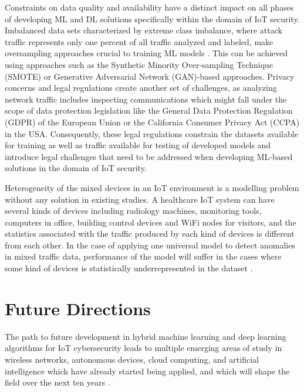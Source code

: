 \documentclass[12pt]{article}
\begin{document}
Constraints on data quality and availability have a distinct impact on all phases of developing ML and DL solutions specifically within the domain of IoT security. Imbalanced data sets characterized by extreme class imbalance, where attack traffic represents only one percent of all traffic analyzed and labeled, make oversampling approaches crucial to training ML models \cite{pajouh2019two}. This can be achieved using approaches such as the Synthetic Minority Over-sampling Technique (SMOTE) or Generative Adversarial Network (GAN)-based approaches. Privacy concerns and legal regulations create another set of challenges, as analyzing network traffic includes inspecting communications which might fall under the scope of data protection legislation like the General Data Protection Regulation (GDPR) of the European Union or the California Consumer Privacy Act (CCPA) in the USA. Consequently, these legal regulations constrain the datasets available for training as well as traffic available for testing of developed models and introduce legal challenges that need to be addressed when developing ML-based solutions in the domain of IoT security.

Heterogeneity of the mixed devices in an IoT environment is a modelling problem without any solution in existing studies. A healthcare IoT system can have several kinds of devices including radiology machines, monitoring tools, computers in office, building control devices and WiFi nodes for visitors, and the statistics associated with the traffic produced by each kind of devices is different from each other. In the case of applying one universal model to detect anomalies in mixed traffic data, performance of the model will suffer in the cases where some kind of devices is statistically underrepresented in the dataset \cite{alaba2017internet}.


\section{Future Directions}

The path to future development in hybrid machine learning and deep learning algorithms for IoT cybersecurity leads to multiple emerging areas of study in wireless networks, autonomous devices, cloud computing, and artificial intelligence which have already started being applied, and which will shape the field over the next ten years \cite{zhang2019hybrid}.
\end{document}
